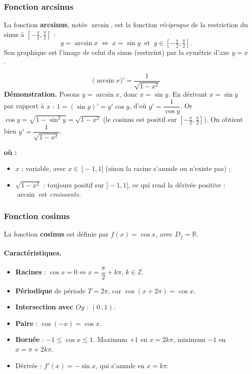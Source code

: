 \documentclass[11pt,a4paper]{article}
\newenvironment{ou}{%
  \par\smallskip\noindent\textbf{où :}\nopagebreak
  \begin{itemize}[leftmargin=1.8em,topsep=2pt,itemsep=1.5pt,parsep=0pt]}%
  {\end{itemize}}
\newcommand{\R}{\mathbb{R}}
\newcommand{\Z}{\mathbb{Z}}
\newcommand{\Df}{D_f}
\begin{document}
\subsubsection{Fonction arcsinus}

\begin{definition}
La fonction \textbf{arcsinus}, notée $\arcsin$, est la fonction \emph{réciproque} de la
restriction du sinus à $\left[-\tfrac{\pi}{2},\tfrac{\pi}{2}\right]$ :
\[
  y=\arcsin x \;\Longleftrightarrow\; x=\sin y \ \text{ et } \ y\in\left[-\tfrac{\pi}{2},\tfrac{\pi}{2}\right].
\]
Son graphique est l'image de celui du sinus (restreint) par la symétrie d'axe $y=x$.
\end{definition}

\begin{formule}
\[
  \boxed{\;\big(\arcsin x\big)'=\dfrac{1}{\sqrt{1-x^2}}\;}
\]
\textbf{Démonstration.} Posons $y=\arcsin x$, donc $x=\sin y$. En dérivant
$x=\sin y$ par rapport à $x$ : $1=(\sin y)'=y'\cos y$, d'où $y'=\dfrac{1}{\cos y}$. Or
$\cos y=\sqrt{1-\sin^2 y}=\sqrt{1-x^2}$ (le cosinus est positif sur
$\left[-\tfrac{\pi}{2},\tfrac{\pi}{2}\right]$). On obtient bien
$y'=\dfrac{1}{\sqrt{1-x^2}}$.
\begin{ou}
  \item $x$ : variable, avec $x\in\,]-1,1[$ (sinon la racine s'annule ou n'existe pas) ;
  \item $\sqrt{1-x^2}$ : toujours positif sur $]-1,1[$, ce qui rend la dérivée positive : $\arcsin$ est \emph{croissante}.
\end{ou}
\end{formule}

\subsubsection{Fonction cosinus}

\begin{definition}
La fonction \textbf{cosinus} est définie par $f(x)=\cos x$, avec $\Df=\R$.
\end{definition}

\paragraph{Caractéristiques.}
\begin{itemize}[leftmargin=1.5em,topsep=2pt,itemsep=2pt]
  \item \textbf{Racines} : $\cos x=0 \Leftrightarrow x=\dfrac{\pi}{2}+k\pi$, $k\in\Z$.
  \item \textbf{Périodique} de période $T=2\pi$, car $\cos(x+2\pi)=\cos x$.
  \item \textbf{Intersection avec $Oy$} : $(0\,;1)$.
  \item \textbf{Paire} : $\cos(-x)=\cos x$.
  \item \textbf{Bornée} : $-1\leq\cos x\leq 1$. Maximum $+1$ en $x=2k\pi$, minimum $-1$ en
        $x=\pi+2k\pi$.
  \item Dérivée : $f'(x)=-\sin x$, qui s'annule en $x=k\pi$.
\end{itemize}
\end{document}
